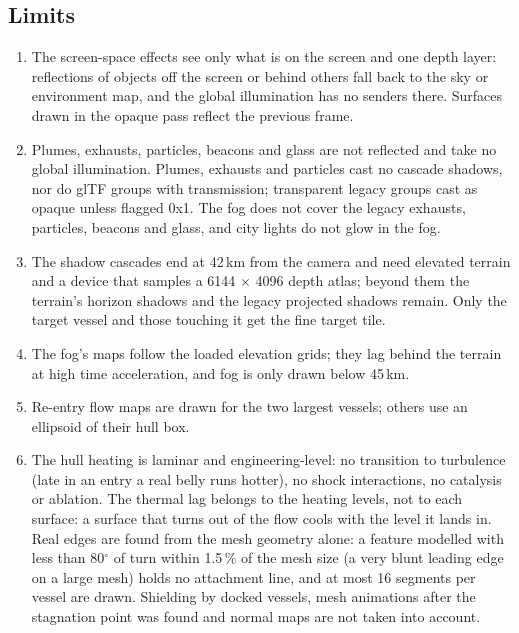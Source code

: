 \documentclass[Orbiter Technical Reference.tex]{subfiles}
\begin{document}
\begin{sloppypar}
\subsection{Limits}
\begin{enumerate}
\item The screen-space effects see only what is on the screen and one depth layer: reflections of objects off the screen or behind others fall back to the sky or environment map, and the global illumination has no senders there. Surfaces drawn in the opaque pass reflect the previous frame.
\item Plumes, exhausts, particles, beacons and glass are not reflected and take no global illumination. Plumes, exhausts and particles cast no cascade shadows, nor do glTF groups with transmission; transparent legacy groups cast as opaque unless flagged 0x1. The fog does not cover the legacy exhausts, particles, beacons and glass, and city lights do not glow in the fog.
\item The shadow cascades end at 42\,km from the camera and need elevated terrain and a device that samples a 6144 $\times$ 4096 depth atlas; beyond them the terrain's horizon shadows and the legacy projected shadows remain. Only the target vessel and those touching it get the fine target tile.
\item The fog's maps follow the loaded elevation grids; they lag behind the terrain at high time acceleration, and fog is only drawn below 45\,km.
\item Re-entry flow maps are drawn for the two largest vessels; others use an ellipsoid of their hull box.
\item The hull heating is laminar and engineering-level: no transition to turbulence (late in an entry a real belly runs hotter), no shock interactions, no catalysis or ablation. The thermal lag belongs to the heating levels, not to each surface: a surface that turns out of the flow cools with the level it lands in. Real edges are found from the mesh geometry alone: a feature modelled with less than 80$^{\circ}$ of turn within 1.5\,\% of the mesh size (a very blunt leading edge on a large mesh) holds no attachment line, and at most 16 segments per vessel are drawn. Shielding by docked vessels, mesh animations after the stagnation point was found and normal maps are not taken into account.
\end{enumerate}

\end{sloppypar}
\end{document}
